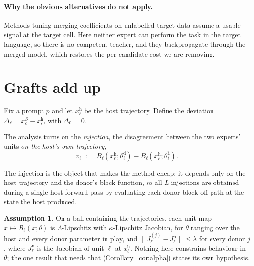 \documentclass[10pt]{article}
\theoremstyle{plain}
\theoremstyle{definition}
\newtheorem{assumption}{Assumption}
\theoremstyle{remark}
\newcommand{\host}{\mathrm{h}}
\newcommand{\donor}{\mathrm{d}}
\begin{document}
\paragraph{Why the obvious alternatives do not apply.}
Methods tuning merging coefficients on unlabelled target data
\citep{yang2024adamerging, symerge2026} assume a usable signal at the target
cell. Here neither expert can perform the task in the target language, so there
is no competent teacher, and they backpropagate through the merged model, which
restores the per-candidate cost we are removing.

\section{Grafts add up}
\label{sec:theory}

Fix a prompt $p$ and let $x^{\host}_\ell$ be the host trajectory. Define the
deviation $\Delta_\ell = x^{S}_\ell - x^{\host}_\ell$, with $\Delta_0 = 0$.

The analysis turns on the \emph{injection}, the disagreement between the two
experts' units \emph{on the host's own trajectory},
\begin{equation}
\label{def:injection}
v_\ell \;:=\; B_\ell\!\left(x^{\host}_\ell;\theta^{\donor}_\ell\right) - B_\ell\!\left(x^{\host}_\ell;\theta^{\host}_\ell\right).
\end{equation}

The injection is the object that makes the method cheap: it depends only on the
host trajectory and the donor's block function, so all $L$ injections are
obtained during a single host forward pass by evaluating each donor block
off-path at the state the host produced.

\begin{assumption}
\label{ass:smooth}
On a ball containing the trajectories, each unit map $x\mapsto B_\ell(x;\theta)$ is
$\Lambda$-Lipschitz with $\kappa$-Lipschitz Jacobian, for $\theta$ ranging over the
host and every donor parameter in play, and
$\|J^{(j)}_\ell - J^{\host}_\ell\|\le\lambda$ for every donor $j$, where
$J^{\bullet}_\ell$ is the Jacobian of unit $\ell$ at $x^{\host}_\ell$. Nothing here
constrains behaviour in $\theta$; the one result that needs that
(Corollary~\ref{cor:alpha}) states its own hypothesis.
\end{assumption}
\end{document}
